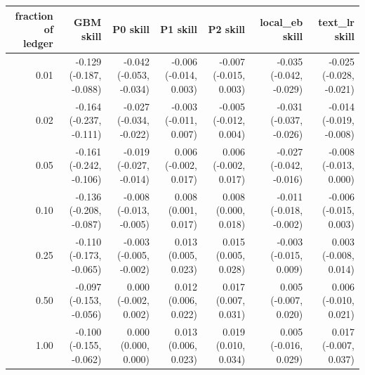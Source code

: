 \begin{tabular}{rrrrrrr}
\toprule
fraction of ledger & GBM skill & P0 skill & P1 skill & P2 skill & local\_eb skill & text\_lr skill \\
\midrule
0.01 & -0.129 (-0.187, -0.088) & -0.042 (-0.053, -0.034) & -0.006 (-0.014, 0.003) & -0.007 (-0.015, 0.003) & -0.035 (-0.042, -0.029) & -0.025 (-0.028, -0.021) \\
0.02 & -0.164 (-0.237, -0.111) & -0.027 (-0.034, -0.022) & -0.003 (-0.011, 0.007) & -0.005 (-0.012, 0.004) & -0.031 (-0.037, -0.026) & -0.014 (-0.019, -0.008) \\
0.05 & -0.161 (-0.242, -0.106) & -0.019 (-0.027, -0.014) & 0.006 (-0.002, 0.017) & 0.006 (-0.002, 0.017) & -0.027 (-0.042, -0.016) & -0.008 (-0.013, 0.000) \\
0.10 & -0.136 (-0.208, -0.087) & -0.008 (-0.013, -0.005) & 0.008 (0.001, 0.017) & 0.008 (0.000, 0.018) & -0.011 (-0.018, -0.002) & -0.006 (-0.015, 0.003) \\
0.25 & -0.110 (-0.173, -0.065) & -0.003 (-0.005, -0.002) & 0.013 (0.005, 0.023) & 0.015 (0.005, 0.028) & -0.003 (-0.015, 0.009) & 0.003 (-0.008, 0.014) \\
0.50 & -0.097 (-0.153, -0.056) & 0.000 (-0.002, 0.002) & 0.012 (0.006, 0.022) & 0.017 (0.007, 0.031) & 0.005 (-0.007, 0.020) & 0.006 (-0.010, 0.021) \\
1.00 & -0.100 (-0.155, -0.062) & 0.000 (0.000, 0.000) & 0.013 (0.006, 0.023) & 0.019 (0.010, 0.034) & 0.005 (-0.016, 0.029) & 0.017 (-0.007, 0.037) \\
\bottomrule
\end{tabular}
